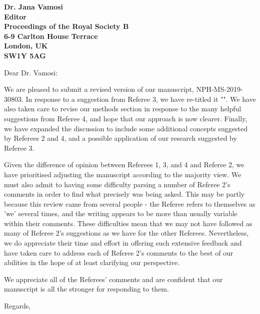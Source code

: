 \documentclass[12pt]{letter}
\begin{document}
\begin{letter}{\bf Dr. Jana Vamosi\\
               Editor\\
               Proceedings of the Royal Society B\\
               6-9 Carlton House Terrace\\
               London, UK\\
               SW1Y 5AG\\
                }

\opening{Dear Dr. Vamosi:}

	We are pleased to submit a revised version of our manuscript, NPH-MS-2019-30803. In response to a suggestion from Referee 3, we have re-titled it "". We have also taken care to revise our methods section in response to the many helpful suggestions from Referee 4, and hope that our approach is now clearer. Finally, we have expanded the discussion to include some additional concepts suggested by Referees 2 and 4, and a possible application of our research suggested by Referee 3. 


	Given the difference of opinion between Referees 1, 3, and 4 and Referee 2, we have prioritised adjusting the manuscript according to the majority view. We must also admit to having some difficulty parsing a number of Referee 2's comments in order to find what precisely was being asked. This may be partly because this review came from several people - the Referee refers to themselves as 'we' several times, and the writing appears to be more than usually variable within their comments. These difficulties mean that we may not have followed as many of Referee 2's suggestions as we have for the other Referees. Nevertheless, we do appreciate their time and effort in offering such extensive feedback and have taken care to address each of Referee 2's comments to the best of our abilities in the hope of at least clarifying our perspective.


	We appreciate all of the Referees' comments and are confident that our manuscript is all the stronger for responding to them.


\closing{Regards,}


\end{letter}

\newpage

\setcounter{page}{1}

\end{document}

